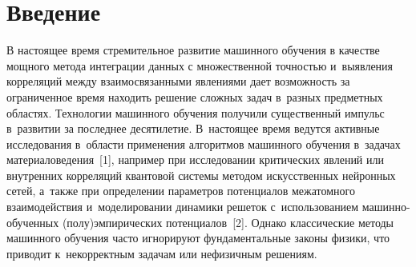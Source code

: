      
  



\thispagestyle{headings}

\begin{multicols}{2}

\label{st\stat}
     
\section{Введение}

    В настоящее время стремительное развитие машинного обучения в качестве 
мощного метода интеграции данных с множественной точ\-ностью и~выявления 
корреляций между взаимосвязанными явлениями дает возможность за 
ограниченное время находить решение сложных задач в~разных предметных 
областях. Технологии машинного обуче\-ния получили существенный импульс 
в~развитии за последнее десятилетие. В~настоящее время ведутся актив\-ные 
исследования в~об\-ласти применения алгоритмов машинного обучения в~задачах 
материаловедения~[1], например при исследовании \mbox{критических} явлений или 
внутренних корреляций квантовой сис\-те\-мы методом искусственных нейронных 
сетей, а~также при определении па\-ра\-мет\-ров потенциалов межатомного 
взаимодействия и~моделировании динамики решеток с~использованием  
ма\-шин\-но-обучен\-ных (полу)эмпирических потенциалов~[2]. Однако 
классические методы машинного обучения час\-то игнорируют фундаментальные 
законы физики, что приводит к~некорректным задачам или нефизичным 
решениям.
    

\end{multicols}
